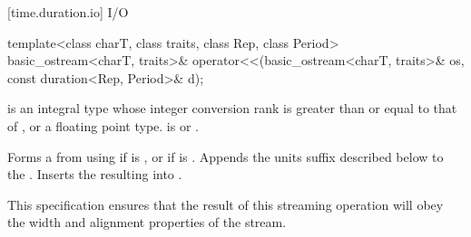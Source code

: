 [time.duration.io]{ I/O}

%
\begin{itemdecl}
template<class charT, class traits, class Rep, class Period>
  basic_ostream<charT, traits>&
    operator<<(basic_ostream<charT, traits>& os, const duration<Rep, Period>& d);
\end{itemdecl}

\begin{itemdescr}
\pnum
\requires {} is an integral type
whose integer conversion rank
is greater than or equal to that of ,
or a floating point type.
 is  or .

\pnum
\effects
Forms a  from 
using  if  is ,
or  if  is .
Appends the units suffix described below to the .
Inserts the resulting  into .
\begin{note}
This specification ensures that the result of this streaming operation
will obey the width and alignment properties of the stream.
\end{note}


\end{itemdescr}
